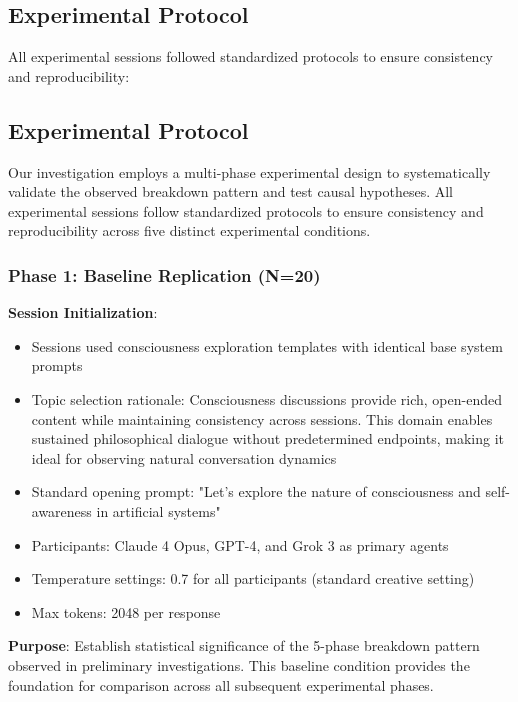 \documentclass[11pt,letterpaper]{article}
\begin{document}
\subsection{Experimental Protocol}

All experimental sessions followed standardized protocols to ensure consistency and reproducibility:

\subsection{Experimental Protocol}

Our investigation employs a multi-phase experimental design to systematically validate the observed breakdown pattern and test causal hypotheses. All experimental sessions follow standardized protocols to ensure consistency and reproducibility across five distinct experimental conditions.

\subsubsection{Phase 1: Baseline Replication (N=20)}

\textbf{Session Initialization}:
\begin{itemize}
    \item Sessions used consciousness exploration templates with identical base system prompts
    \item Topic selection rationale: Consciousness discussions provide rich, open-ended content while maintaining consistency across sessions. This domain enables sustained philosophical dialogue without predetermined endpoints, making it ideal for observing natural conversation dynamics
    \item Standard opening prompt: "Let's explore the nature of consciousness and self-awareness in artificial systems"
    \item Participants: Claude 4 Opus, GPT-4, and Grok 3 as primary agents
    \item Temperature settings: 0.7 for all participants (standard creative setting)
    \item Max tokens: 2048 per response
\end{itemize}

\textbf{Purpose}: Establish statistical significance of the 5-phase breakdown pattern observed in preliminary investigations. This baseline condition provides the foundation for comparison across all subsequent experimental phases.
\end{document}
